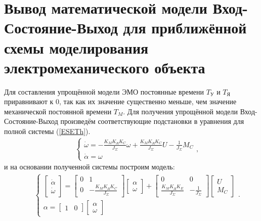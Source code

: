 \documentclass[fleqn, a4paper, 11pt, russian]{article}
\begin{document}
	\section{Вывод математической модели Вход-Состояние-Выход для приближённой схемы моделирования электромеханического объекта}
	Для составления упрощённой модели ЭМО постоянные времени $T_\text{У}$ и $T_\text{Я}$ приравнивают к 0, так как их значение существенно меньше, чем значение механической постоянной времени $T_M$. Для получения упрощённой модели Вход-Состояние-Выход произведём соответствующие подстановки в уравнения для полной системы (\ref{ESETh}).
	\begin{align}
		&&\begin{cases}
			\dot{\omega} = -\displaystyle{\frac{K_MK_\text{Д}K_C}{J_\Sigma}}\omega + \frac{K_MK_\text{Д}K_C}{J_\Sigma}U - \frac{1}{J_\Sigma}M_C\\
			\dot{\alpha} = \omega
		\end{cases},
	\end{align}
	и на основании полученной системы построим модель:
	\begin{align}
		&&\begin{cases}
			\begin{bmatrix}
				\dot{\alpha}\\
				\dot{\omega}
			\end{bmatrix} =
			\begin{bmatrix}
				0 & 1\\
				0 & -\displaystyle{\frac{K_MK_\text{Д}K_C}{J_\Sigma}}
			\end{bmatrix}
			\begin{bmatrix}
				\alpha\\
				\omega
			\end{bmatrix} + 
			\begin{bmatrix}
				0 & 0\\
				\displaystyle{\frac{K_MK_\text{Д}K_E}{J_\Sigma}} & -\displaystyle{\frac{1}{J_\Sigma}}
			\end{bmatrix}
			\begin{bmatrix}
				U\\
				M_C
			\end{bmatrix}\\
			\alpha =
			\begin{bmatrix}
				1 & 0
			\end{bmatrix}
			\begin{bmatrix}
				\alpha\\
				\omega
			\end{bmatrix}
		\end{cases}.
	\end{align}
	
\end{document}

